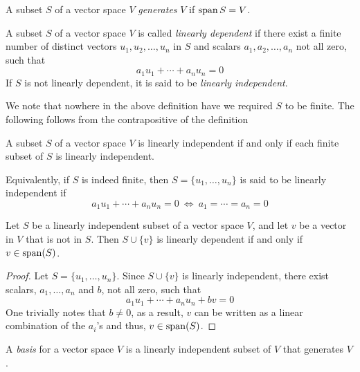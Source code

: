 \begin{definition}
    A subset $S$ of a vector space $V$ \textit{generates} $V$ if $\operatorname{span} S = V$.
\end{definition}

\begin{definition}
    A subset $S$ of a vector space $V$ is called \textit{linearly dependent} if there exist a finite number of distinct vectors $u_1,u_2,\ldots,u_n$ in $S$ and scalars $a_1,a_2,\ldots,a_n$ not all zero, such that 
    \begin{equation*}
        a_1u_1 + \cdots + a_nu_n = 0
    \end{equation*}
    If $S$ is not linearly dependent, it is said to be \textit{linearly independent}.
\end{definition}

We note that nowhere in the above definition have we required $S$ to be finite. The following follows from the contrapositive of the definition
\begin{corollary}
    A subset $S$ of a vector space $V$ is linearly independent if and only if each finite subset of $S$ is linearly independent.
\end{corollary}


Equivalently, if $S$ is indeed finite, then $S = \{u_1,\ldots,u_n\}$ is said to be linearly independent if 
\begin{equation*}
    a_1u_1 + \cdots + a_nu_n = 0 ~\Longleftrightarrow~ a_1 = \cdots = a_n = 0
\end{equation*}

\begin{theorem}
    Let $S$ be a linearly independent subset of a vector space $V$, and let $v$ be a vector in $V$ that is not in $S$. Then $S\cup\{v\}$ is linearly dependent if and only if $v\in\operatorname{span}(S)$.
\end{theorem}
\begin{proof}
    Let $S = \{u_1,\ldots,u_n\}$. Since $S\cup\{v\}$ is linearly independent, there exist scalars, $a_1,\ldots,a_n$ and $b$, not all zero, such that 
    \begin{equation*}
        a_1u_1 + \cdots + a_nu_n + bv = 0
    \end{equation*}
    One trivially notes that $b\ne 0$, as a result, $v$ can be written as a linear combination of the $a_i$'s and thus, $v\in\operatorname{span}(S)$.
\end{proof}

\begin{definition}
    A \textit{basis} for a vector space $V$ is a linearly independent subset of $V$ that generates $V$.
\end{definition}


